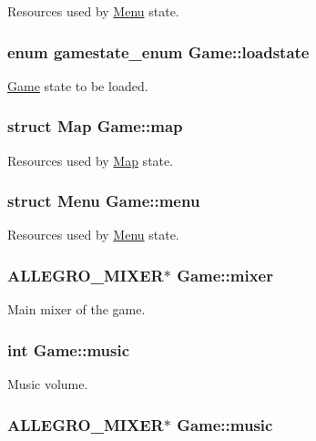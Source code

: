 \-Resources used by \hyperlink{structMenu}{\-Menu} state. \hypertarget{structGame_a026bb8ebb6454c0d87dea503eafa9197}{
\subsubsection[{loadstate}]{\setlength{\rightskip}{0pt plus 5cm}enum {\bf gamestate\-\_\-enum} {\bf \-Game\-::loadstate}}}\label{structGame_a026bb8ebb6454c0d87dea503eafa9197}
\hyperlink{structGame}{\-Game} state to be loaded. \hypertarget{structGame_aaab875b9e556df53251db40341046cab}{
\subsubsection[{map}]{\setlength{\rightskip}{0pt plus 5cm}struct {\bf \-Map} {\bf \-Game\-::map}}}\label{structGame_aaab875b9e556df53251db40341046cab}
\-Resources used by \hyperlink{structMap}{\-Map} state. \hypertarget{structGame_ad120de2e84e2d857dd83fc1116176f21}{
\subsubsection[{menu}]{\setlength{\rightskip}{0pt plus 5cm}struct {\bf \-Menu} {\bf \-Game\-::menu}}}\label{structGame_ad120de2e84e2d857dd83fc1116176f21}
\-Resources used by \hyperlink{structMenu}{\-Menu} state. \hypertarget{structGame_ab8265074be4df5408a7c2fc1fb89dfc4}{
\subsubsection[{mixer}]{\setlength{\rightskip}{0pt plus 5cm}\-A\-L\-L\-E\-G\-R\-O\-\_\-\-M\-I\-X\-E\-R$\ast$ {\bf \-Game\-::mixer}}}\label{structGame_ab8265074be4df5408a7c2fc1fb89dfc4}
\-Main mixer of the game. \hypertarget{structGame_aa8eff7d132a51e5ca97a376433790426}{
\subsubsection[{music}]{\setlength{\rightskip}{0pt plus 5cm}int {\bf \-Game\-::music}}}\label{structGame_aa8eff7d132a51e5ca97a376433790426}
\-Music volume. \hypertarget{structGame_a49891173b349e56fcda6b0a0e39a47ee}{
\subsubsection[{music}]{\setlength{\rightskip}{0pt plus 5cm}\-A\-L\-L\-E\-G\-R\-O\-\_\-\-M\-I\-X\-E\-R$\ast$ {\bf \-Game\-::music}}}\label{structGame_a49891173b349e56fcda6b0a0e39a47ee}
